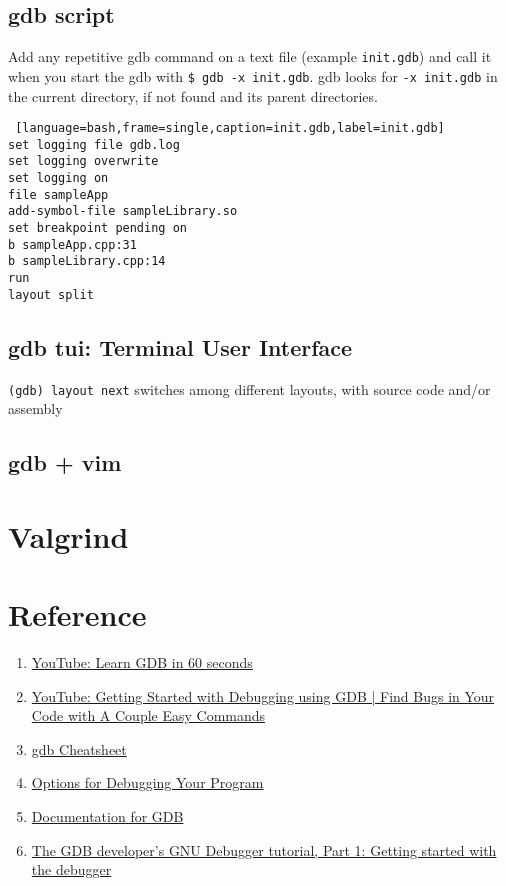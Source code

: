 \subsection{gdb script}

Add any repetitive gdb command on a text file (example \texttt{init.gdb}) and call it when you start the gdb with \texttt{\$ gdb -x init.gdb}.
gdb looks for \texttt{-x init.gdb} in the current directory, if not found and its parent directories.

\begin{lstlisting} [language=bash,frame=single,caption=init.gdb,label=init.gdb]
set logging file gdb.log
set logging overwrite
set logging on
file sampleApp
add-symbol-file sampleLibrary.so
set breakpoint pending on
b sampleApp.cpp:31
b sampleLibrary.cpp:14
run
layout split
\end{lstlisting}

\subsection{gdb tui: Terminal User Interface}
\texttt{(gdb) layout next} switches among different layouts, with source code and/or assembly


\subsection{gdb + vim}

\section{Valgrind}


\section{Reference}
\begin{enumerate}
  \item \href{https://www.youtube.com/watch?v=mfmXcbiRs0E&list=PL9IEJIKnBJjHGWPN_S9NS_Ky1-tC8ZrUI}{YouTube: Learn GDB in 60 seconds}

  \item \href{https://www.youtube.com/watch?v=Dq8l1_-QgAc}{YouTube: Getting Started with Debugging using GDB | Find Bugs in Your Code with A Couple Easy Commands}

  \item \href{https://www.google.com/url?q=https://cs.brown.edu/courses/cs033/docs/guides/gdb.pdf&sa=D&source=docs&ust=1661288718090053&usg=AOvVaw3EbYRk1zHStEJlu-FSbeiY}{gdb Cheatsheet}

  \item \href{https://gcc.gnu.org/onlinedocs/gcc/index.html#toc-GCC-Command-Options}{Options for Debugging Your Program}

  \item \href{https://sourceware.org/gdb/download/onlinedocs/}{Documentation for GDB}

  \item \href{https://developers.redhat.com/blog/2021/04/30/the-gdb-developers-gnu-debugger-tutorial-part-1-getting-started-with-the-debugger#}{The GDB developer's GNU Debugger tutorial, Part 1: Getting started with the debugger}
\end{enumerate}
